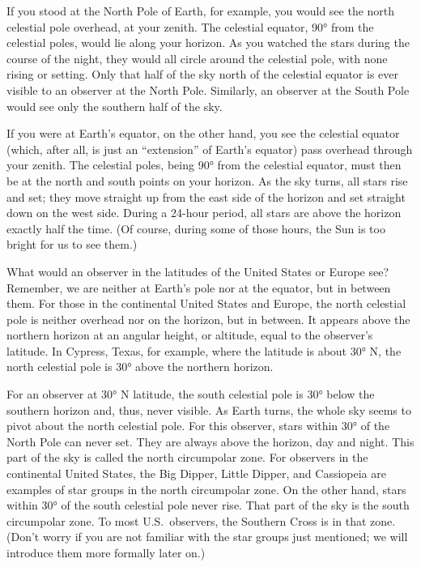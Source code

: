 \documentclass[../../main-astronomy.tex]{subfiles}
\begin{document}
If you stood at the North Pole of Earth, for example, you would see the north celestial pole overhead, at your zenith. The celestial equator, \ang{90} from the celestial poles, would lie along your horizon. As you watched the stars during the course of the night, they would all circle around the celestial pole, with none rising or setting. Only that half of the sky north of the celestial equator is ever visible to an observer at the North Pole. Similarly, an observer at the South Pole would see only the southern half of the sky.

\vspace{1em}

If you were at Earth's equator, on the other hand, you see the celestial equator (which, after all, is just an ``extension'' of Earth's equator) pass overhead through your zenith. The celestial poles, being \ang{90} from the celestial equator, must then be at the north and south points on your horizon. As the sky turns, all stars rise and set; they move straight up from the east side of the horizon and set straight down on the west side. During a 24-hour period, all stars are above the horizon exactly half the time. (Of course, during some of those hours, the Sun is too bright for us to see them.)

\vspace{1em}

What would an observer in the latitudes of the United States or Europe see? Remember, we are neither at Earth's pole nor at the equator, but in between them. For those in the continental United States and Europe, the north celestial pole is neither overhead nor on the horizon, but in between. It appears above the northern horizon at an angular height, or altitude, equal to the observer's latitude. In Cypress, Texas, for example, where the latitude is about \ang{30} N, the north celestial pole is \ang{30} above the northern horizon.

\vspace{1em}

For an observer at \ang{30} N latitude, the south celestial pole is \ang{30} below the southern horizon and, thus, never visible. As Earth turns, the whole sky seems to pivot about the north celestial pole. For this observer, stars within \ang{30} of the North Pole can never set. They are always above the horizon, day and night. This part of the sky is called the north \gls{circumpolar zone}. For observers in the continental United States, the Big Dipper, Little Dipper, and Cassiopeia are examples of star groups in the north circumpolar zone. On the other hand, stars within \ang{30} of the south celestial pole never rise. That part of the sky is the south circumpolar zone. To most U.S.~observers, the Southern Cross is in that zone. (Don't worry if you are not familiar with the star groups just mentioned; we will introduce them more formally later on.)
\end{document}
